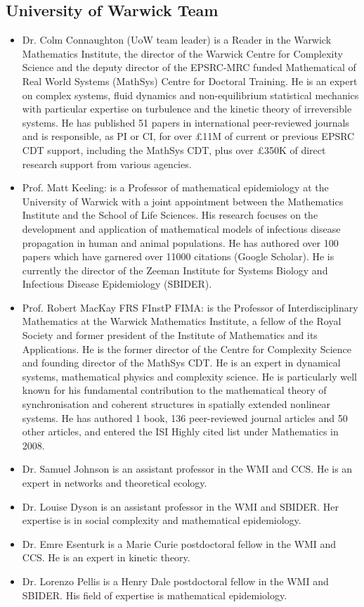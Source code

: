 \subsection{University of Warwick Team}
\begin{itemize}
\item
{\hvnb Dr. Colm Connaughton (UoW team leader)}  is a Reader in the Warwick 
Mathematics Institute, the director of the Warwick Centre for Complexity 
Science and the deputy director of the EPSRC-MRC funded Mathematical of Real 
World Systems (MathSys) Centre for Doctoral Training. He is an expert on 
complex systems, fluid dynamics and non-equilibrium statistical mechanics with 
particular expertise on turbulence and the kinetic theory of irreversible 
systems. He has published 51 papers in international peer-reviewed journals and 
is responsible, as PI or CI, for over \pounds 11M of current or previous EPSRC 
CDT support, including the MathSys CDT, plus over \pounds 350K of direct 
research support from various agencies. 
\item {\hvnb Prof. Matt Keeling:} is a Professor of mathematical epidemiology 
at the University of Warwick with a joint appointment between the Mathematics 
Institute and the School of Life Sciences. His research focuses on the 
development and application of mathematical models of infectious disease 
propagation in human and animal populations.  He has authored over 100 papers 
which have garnered over 11000 citations (Google Scholar). He is currently the 
director of the Zeeman Institute for Systems Biology and Infectious Disease 
Epidemiology (SBIDER).
\item {\hvnb Prof. Robert MacKay FRS FInstP FIMA:} is the Professor of 
Interdisciplinary Mathematics at the Warwick Mathematics Institute, a fellow of 
the Royal Society and former president of the Institute of Mathematics and its 
Applications. He is the former director of the Centre for Complexity Science 
and founding director of the MathSys CDT. He is an expert in dynamical systems, 
mathematical physics and complexity science. He is particularly well known for 
his fundamental contribution to the mathematical theory of synchronisation and 
coherent structures in spatially extended nonlinear systems.   He has authored 
1 book, 136 peer-reviewed journal articles and 50 other articles, and entered 
the ISI Highly cited list under Mathematics in 2008.
\item{\hvnb Dr. Samuel Johnson} is an assistant professor in the WMI and CCS.  
He is an expert in networks and theoretical ecology.
\item{\hvnb Dr. Louise Dyson} is an assistant professor in the WMI and SBIDER.  
Her expertise is in social complexity and mathematical epidemiology.
\item{\hvnb Dr. Emre Esenturk} is a Marie Curie postdoctoral fellow in the WMI 
and CCS. He is an expert in kinetic theory.
\item{\hvnb Dr. Lorenzo Pellis} is a Henry Dale postdoctoral fellow in the WMI 
and SBIDER. His field of expertise is mathematical epidemiology.
\end{itemize}

